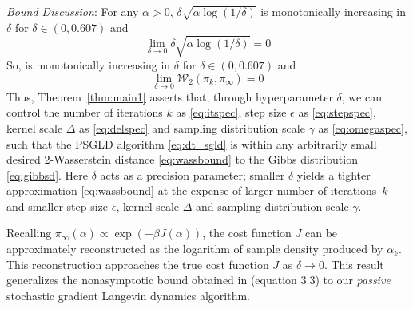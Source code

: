 \documentclass[journal,onecolumn]{IEEEtran}
\newcommand{\alk}{\alpha_k}
\newcommand{\step}{\epsilon}
\newcommand{\rew}{J}
\newcommand{\wass}{\mathcal{W}_2}
\newcommand{\gibbs}{\ids_{\infty}}
\newcommand{\dtlaw}{\ids_{k}} %
\newcommand{\ids}{\pi}
\newcommand{\idw}{\gamma}
\newcommand{\ksp}{k,\idw}
\begin{document}
\textit{Bound Discussion}: For any $\alpha>0$, $\delta\sqrt{\alpha\log\left(1/\delta\right)}$ is monotonically increasing in $\delta$ for $\delta \in (0,0.607)$ and
\[\lim_{\delta\to0}\delta\sqrt{\alpha\log\left(1/\delta\right)}=0\] So, \color{black}{our upper bound \eqref{eq:wassbound} on $\wass(\dtlaw,\gibbs)$} is monotonically increasing in $\delta$ for $\delta \in (0,0.607)$ and \[\lim_{\delta\to0}\wass(\dtlaw,\gibbs) = 0\]
Thus, Theorem~\ref{thm:main1} asserts that, through hyperparameter $\delta$, we can control the  number of iterations $k$ as \eqref{eq:itspec}, step size $\step$ as \eqref{eq:stepspec}, kernel scale $\Delta$ as \eqref{eq:delspec} and sampling distribution scale $\idw$ as \eqref{eq:omegaspec}, such that the PSGLD algorithm \eqref{eq:dt_sgld} is within any arbitrarily small desired 2-Wasserstein distance \eqref{eq:wassbound} to the Gibbs distribution \eqref{eq:gibbsd}. Here $\delta$ acts as a precision parameter; smaller $\delta$ yields a tighter approximation \eqref{eq:wassbound} at the expense of larger number of iterations~$k$ and smaller step size $\step$, kernel scale $\Delta$ and sampling distribution scale $\idw$. 

Recalling  $\gibbs(\alpha) \propto \exp(-\beta\rew(\alpha))$, the cost function $\rew$ can be approximately reconstructed as the logarithm of sample density produced by $\alk$. This reconstruction approaches the true cost function $\rew$ as $\delta \to 0$. This result generalizes the nonasymptotic bound obtained in \cite{raginsky2017non} (equation 3.3) to our \textit{passive} stochastic gradient Langevin dynamics algorithm. 

\vspace{0.1cm}
 
\end{document}
